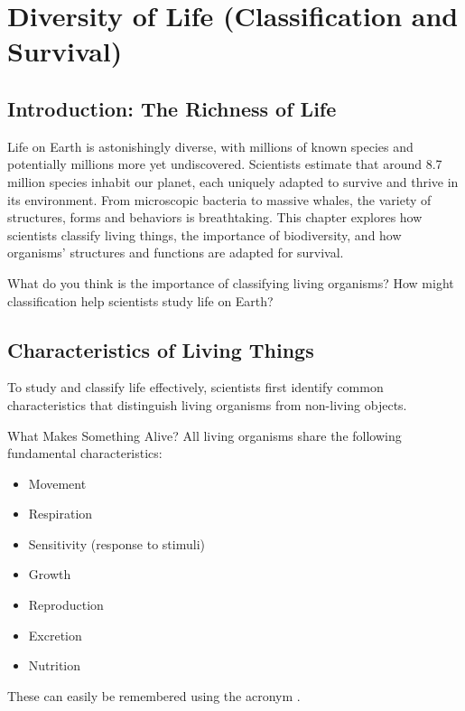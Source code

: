 \chapter{Diversity of Life (Classification and Survival)}

\section{Introduction: The Richness of Life}

Life on Earth is astonishingly diverse, with millions of known species and potentially millions more yet undiscovered. Scientists estimate that around 8.7 million species inhabit our planet, each uniquely adapted to survive and thrive in its environment. From microscopic bacteria to massive whales, the variety of structures, forms and behaviors is breathtaking. This chapter explores how scientists classify living things, the importance of biodiversity, and how organisms' structures and functions are adapted for survival.


\begin{stopandthink}
What do you think is the importance of classifying living organisms? How might classification help scientists study life on Earth?
\end{stopandthink}

\section{Characteristics of Living Things}

To study and classify life effectively, scientists first identify common characteristics that distinguish living organisms from non-living objects.

\begin{keyconcept}{What Makes Something Alive?}
All living organisms share the following fundamental characteristics:
\begin{itemize}
    \item Movement
    \item Respiration
    \item Sensitivity (response to stimuli)
    \item Growth
    \item Reproduction
    \item Excretion
    \item Nutrition
\end{itemize}
These can easily be remembered using the acronym .
\end{keyconcept}

